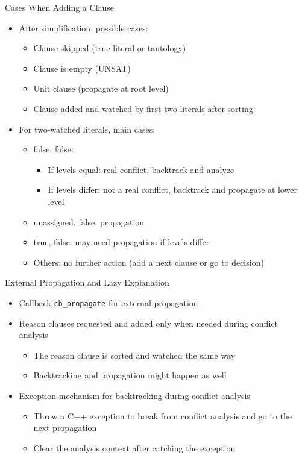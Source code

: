 \documentclass{beamer}
\newcommand*{\code}[1]{\lstinline[basicstyle=\ttfamily, breaklines]|#1|}
\begin{document}
\begin{frame}{Cases When Adding a Clause}
  \begin{itemize}
    \item After simplification, possible cases:
      \begin{itemize}
        \item Clause skipped (true literal or tautology)
        \item Clause is empty (UNSAT)
        \item Unit clause (propagate at root level)
        \item Clause added and watched by first two literals after sorting
      \end{itemize}
    \item For two-watched literals, main cases:
      \begin{itemize}
        \item false, false:
          \begin{itemize}
            \item If levels equal: real conflict, backtrack and analyze
            \item If levels differ: not a real conflict, backtrack and propagate at lower level
          \end{itemize}
        \item unassigned, false: propagation
        \item true, false: may need propagation if levels differ
        \item Others: no further action (add a next clause or go to decision)
      \end{itemize}
  \end{itemize}
\end{frame}

\begin{frame}{External Propagation and Lazy Explanation}
  \begin{itemize}
    \item Callback \code{cb_propagate} for external propagation
    \item Reason clauses requested and added only when needed during conflict analysis
      \begin{itemize}
        \item The reason clause is sorted and watched the same way
        \item Backtracking and propagation might happen as well
      \end{itemize}
    \item Exception mechanism for backtracking during conflict analysis
      \begin{itemize}
        \item Throw a C++ exception to break from conflict analysis and go to the next propagation
        \item Clear the analysis context after catching the exception
      \end{itemize}
  \end{itemize}
\end{frame}
\end{document}
